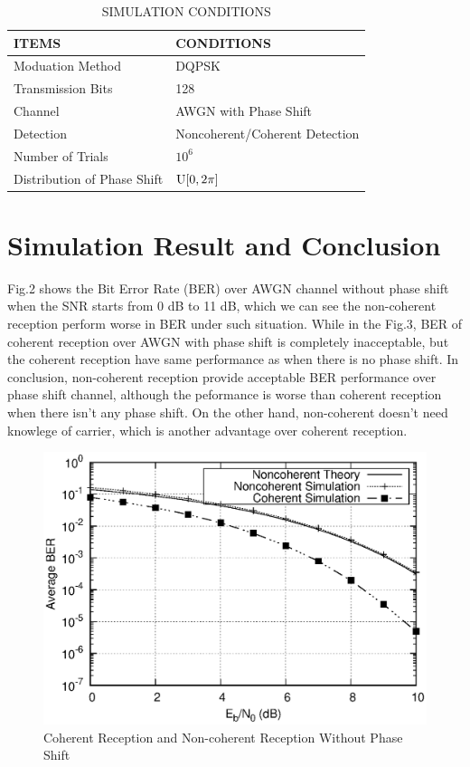 \documentclass[technicalreport]{ieicej}
\begin{document}
\begin{table}[hb]
	\begin{center}
	\caption{SIMULATION CONDITIONS}
	\label{tbl:simu}
	\small
	\begin{tabular}{ll}
	\hline
	ITEMS & CONDITIONS\\
	\hline
	Moduation Method & DQPSK \\
	Transmission Bits & 128 \\
	Channel & AWGN with Phase Shift \\
	Detection & Noncoherent/Coherent Detection \\
	Number of Trials & $10^{6}$\\
	Distribution of Phase Shift & ${\rm U}[0,2\pi]$\\
	\hline
	\end{tabular}
	\end{center}
\end{table}

\section{Simulation Result and Conclusion}
Fig.2 shows the Bit Error Rate (BER) over AWGN channel without phase shift when the SNR starts from 0 dB to 11 dB, which we can see the non-coherent reception perform worse in BER under such situation\cite{babu2011evaluation}. While in the Fig.3, BER of coherent reception over AWGN with phase shift is completely inacceptable, but the coherent reception have same performance as when there is no phase shift.
In conclusion, non-coherent reception provide acceptable BER performance over phase shift channel, although the peformance is worse than coherent reception when there isn't any phase shift. On the other hand, non-coherent doesn't need knowlege of carrier, which is another advantage over coherent reception.

\begin{figure}[tbp]
	\begin{center}
		\vspace{0cm}
		\includegraphics[width=\linewidth,clip]{fig/without_shift.eps}
		\caption{Coherent Reception and Non-coherent Reception Without Phase Shift}
		\label{fig:sample}
	\end{center}
\end{figure}
\end{document}
